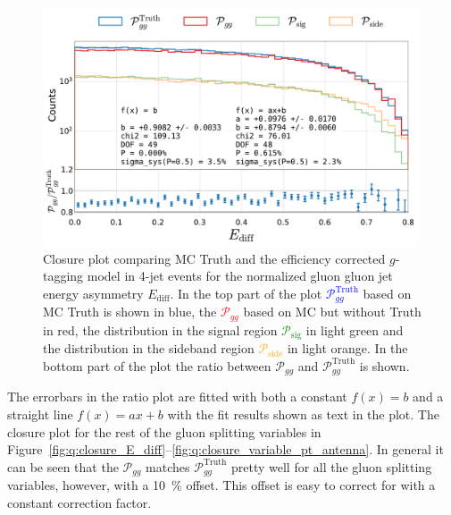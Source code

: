 \begin{figure}[h!]
  \centerfloat
  \includegraphics[width=0.99\textwidth, trim=10 0 20 5, clip, page=1]{figures/quarks/gtag-closure_test-down_sample=1.00-ML_vars=vertex-selection=b-ejet_min=4-n_iter_RS_lgb=99-n_iter_RS_xgb=9-cdot_cut=0.90-version=19-njet=4.pdf}
  \vspace{-5mm}
  \caption[Closure Plot Comparing MC Truth and the Efficiency Corrected $g$-Tagging Model in 4-Jet Events for the Normalized Gluon Gluon Jet Energy Asymmetry]
          {Closure plot comparing MC Truth and the efficiency corrected $g$-tagging model in 4-jet events for the normalized gluon gluon jet energy asymmetry $E_\mathrm{diff}$. In the top part of the plot \textcolor{blue}{$\mathcal{P}_{gg}^\mathrm{Truth}$} based on MC Truth is shown in blue, the \textcolor{red}{$\mathcal{P}_{gg}$} based on MC but without Truth in red, the distribution in the signal region \textcolor{green}{$\mathcal{P}_{\mathrm{sig}}$} in light green and the distribution in the sideband region \textcolor{orange}{$\mathcal{P}_{\mathrm{side}}$} in light orange. In the bottom part of the plot the ratio between $\mathcal{P}_{gg}$ and $\mathcal{P}_{gg}^\mathrm{Truth}$  is shown. 
          } 
  \label{fig:q:closure_E_diff_non_appendix}
\end{figure}

The errorbars in the ratio plot are fitted with both a constant $f(x)=b$ and a straight line $f(x)=ax+b$ with the fit results shown as text in the plot. The closure plot for the rest of the gluon splitting variables in Figure~\ref{fig:q:closure_E_diff}--\ref{fig:q:closure_variable_pt_antenna}. In general it can be seen that the $\mathcal{P}_{gg}$ matches $\mathcal{P}_{gg}^\mathrm{Truth}$ pretty well for all the gluon splitting variables, however, with a \SI{10}{\percent} offset. This offset is easy to correct for with a constant correction factor. 

